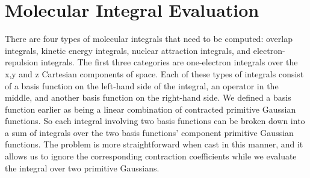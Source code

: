 \documentclass[12pt]{article}
\begin{document}
\section{Molecular Integral Evaluation}
There are four types of molecular integrals that need to be computed: overlap integrals,
kinetic energy integrals, nuclear attraction integrals, and electron-repulsion integrals.
The first three categories are one-electron integrals over the x,y and z Cartesian components
of space. Each of these types of integrals consist of a basis function on the left-hand side of
the integral, an operator in the middle, and another basis function on the right-hand side.
We defined a basis function earlier as being a linear combination of contracted primitive Gaussian
functions. So each integral involving two basis functions can be broken down into a sum
of integrals over the two basis functions' component primitive Gaussian functions.
The problem is more straightforward when cast in this manner, and it allows us to ignore the
corresponding contraction coefficients while we evaluate the integral over two primitive
Gaussians.
\end{document}

